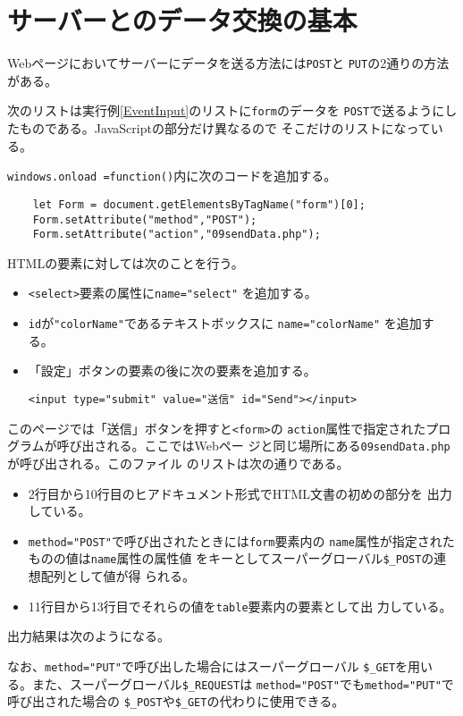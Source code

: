 \section{サーバーとのデータ交換の基本}
Webページにおいてサーバーにデータを送る方法には\texttt{POST}と
\texttt{PUT}の2通りの方法がある。
\begin{Exec}\upshape\label{dataexchange}
 次のリストは実行例\ref{EventInput}のリストに\texttt{form}のデータを
 \texttt{POST}で送るようにしたものである。JavaScriptの部分だけ異なるので
 そこだけのリストになっている。

\texttt{windows.onload =function()}内に次のコードを追加する。
\begin{Verbatim}
    let Form = document.getElementsByTagName("form")[0];
    Form.setAttribute("method","POST");
    Form.setAttribute("action","09sendData.php");
\end{Verbatim}
HTMLの要素に対しては次のことを行う。
\begin{itemize}
 \item \texttt{<select>}要素の属性に\Verb+name="select"+ を追加する。
 \item \texttt{id}が\Verb+"colorName"+であるテキストボックスに
       \Verb+name="colorName"+ を追加する。
 \item 「設定」ボタンの要素の後に次の要素を追加する。
\begin{center}
\Verb+<input type="submit" value="送信" id="Send"></input>+ 
\end{center}
\end{itemize}
このページでは「送信」ボタンを押すと\texttt{<form>}の
\texttt{action}属性で指定されたプログラムが呼び出される。ここではWebペー
 ジと同じ場所にある\texttt{09sendData.php}が呼び出される。このファイル
 のリストは次の通りである。
\begin{itemize}
 \item 2行目から10行目のヒアドキュメント形式でHTML文書の初めの部分を
       出力している。
 \item \Verb+method="POST"+で呼び出されたときには\texttt{form}要素内の
       \texttt{name}属性が指定されたものの値は\texttt{name}属性の属性値
       をキーとしてスーパーグローバル\Verb+$_POST+の連想配列として値が得
       られる。
 \item 11行目から13行目でそれらの値を\texttt{table}要素内の要素として出
       力している。
\end{itemize}
出力結果は次のようになる。
\end{Exec}
なお、\Verb+method="PUT"+で呼び出した場合にはスーパーグローバル
\Verb+$_GET+を用いる。また、スーパーグローバル\Verb+$_REQUEST+は
\Verb+method="POST"+でも\Verb+method="PUT"+で呼び出された場合の
\Verb+$_POST+や\Verb+$_GET+の代わりに使用できる。

